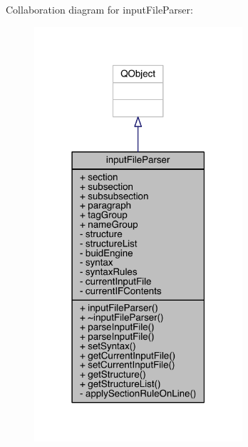Collaboration diagram for input\+File\+Parser\+:\nopagebreak
\begin{figure}[H]
\begin{center}
\leavevmode
\includegraphics[width=219pt]{classinput_file_parser__coll__graph}
\end{center}
\end{figure}
